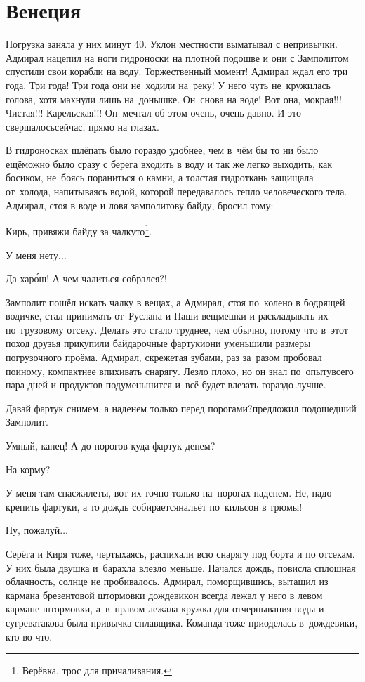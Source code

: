 \chapter{Венеция}
\vepsianrose

Погрузка заняла у них минут 40. Уклон местности выматывал с непривычки. Адмирал нацепил на ноги гидроноски на плотной подошве и они с Замполитом спустили свои корабли на воду. Торжественный момент! Адмирал ждал его три года. Три года! Три года они не~ходили на~реку! У него чуть не~кружилась голова, хотя махнули лишь на~донышке. Он~снова на воде! Вот она, мокрая!!! Чистая!!! Карельская!!! Он~мечтал об этом очень, очень давно. И это свершалось\mdash сейчас, прямо на глазах.

В гидроносках шлёпать было гораздо удобнее, чем в~чём бы то ни было ещё\mdash можно было сразу с берега входить в воду и так же легко выходить, как босиком, не~боясь пораниться о камни, а толстая гидроткань защищала от~холода, напитываясь водой, которой передавалось тепло человеческого тела. Адмирал, стоя в воде и ловя замполитову байду, бросил тому:

\diagdash Кирь, привяжи байду за чалку\sdash то\footnote{Верёвка, трос для причаливания.}.

\diagdash У меня нету$\ldots$

\diagdash Да хар\'{о}ш! А чем чалиться собрался?!

Замполит пошёл искать чалку в вещах, а Адмирал, стоя по~колено в бодрящей водичке, стал принимать от~Руслана и Паши вещмешки и раскладывать их по~грузовому отсеку. Делать это стало труднее, чем обычно, потому что в~этот поход друзья прикупили байдарочные фартуки\mdash они уменьшили размеры погрузочного проёма. Адмирал, скрежетая зубами, раз за~разом пробовал по\sdash иному, компактнее впихивать снарягу. Лезло плохо, но он знал по~опыту\mdash всего пара дней и продуктов подуменьшится и~всё будет влезать гораздо лучше.

\diagdash Давай фартук снимем, а наденем только перед порогами?\mdash предложил подошедший Замполит. 

\diagdash Умный, капец! А до порогов куда фартук денем? 

\diagdash На корму?

\diagdash У меня там спасжилеты, вот их точно только на~порогах наденем. Не, надо крепить фартуки, а то дождь собирается\mdash нальёт по~кильсон в трюмы!

\diagdash Ну, пожалуй$\ldots$

Серёга и Киря тоже, чертыхаясь, распихали всю снарягу под борта и по отсекам. У них была двушка и~барахла влезло меньше. Начался дождь, повисла сплошная облачность, солнце не пробивалось. Адмирал, поморщившись, вытащил из кармана брезентовой штормовки дождевик\mdash он всегда лежал у него в левом кармане штормовки, а~в~правом лежала кружка для отчерпывания воды и сугрева\mdash такова была привычка сплавщика. Команда тоже приоделась в~дождевики, кто во что.

